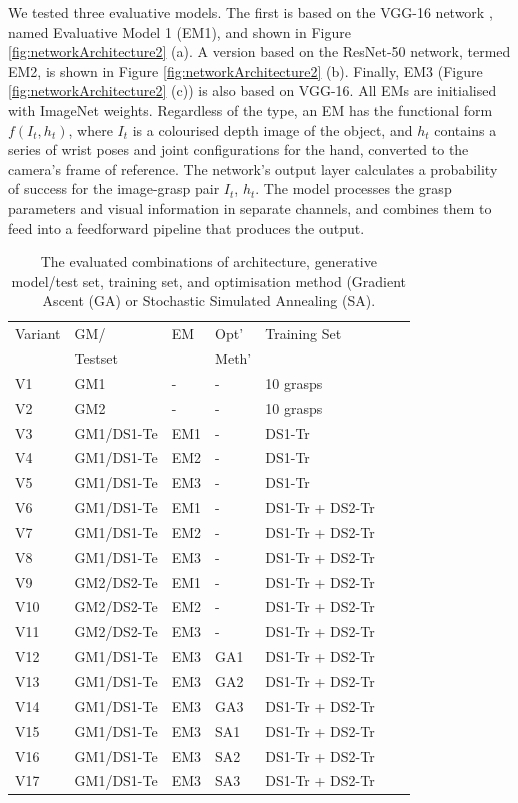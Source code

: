 We tested three evaluative models. The first is based on the VGG-16 network \cite{Simonyan14c}, named Evaluative Model 1 (EM1), and shown in Figure \ref{fig:networkArchitecture2} (a). A version based on the ResNet-50 network, termed EM2, is shown in Figure \ref{fig:networkArchitecture2} (b). Finally, EM3 (Figure \ref{fig:networkArchitecture2} (c)) is also based on VGG-16. All EMs are initialised with ImageNet weights. Regardless of the type, an EM has the functional form $f(I_t, h_t)$, where $I_t$ is a colourised depth image of the object, and $h_t$ contains a series of wrist poses and joint configurations for the hand, converted to the camera's frame of reference. The network's output layer calculates a probability of success for the image-grasp pair $I_t$, $h_t$. The model processes the grasp parameters and visual information in separate channels, and combines them to feed into a feedforward pipeline that produces the output.
\begin{table}[b]
\footnotesize
\centering
\begin{tabular}{|l|l|l|l|l|l|l|}
\hline
Variant & GM/  & EM & Opt'  & Training Set \\ 
 & Testset & & Meth' & \\ \hline
V1 & GM1    & - & - & 10 grasps  \\ \hline
V2 & GM2    & - & - & 10 grasps  \\ \hline
V3 & GM1/DS1-Te & EM1 & - & DS1-Tr \\ \hline
V4 & GM1/DS1-Te & EM2 & - & DS1-Tr \\ \hline
V5 & GM1/DS1-Te & EM3 & - & DS1-Tr  \\ \hline
V6 & GM1/DS1-Te & EM1 & - & DS1-Tr + DS2-Tr \\ \hline
V7 & GM1/DS1-Te & EM2 & - & DS1-Tr + DS2-Tr \\ \hline
V8 & GM1/DS1-Te & EM3 & - & DS1-Tr + DS2-Tr \\ \hline
V9 & GM2/DS2-Te & EM1 & - & DS1-Tr + DS2-Tr \\ \hline
V10 & GM2/DS2-Te & EM2 & - & DS1-Tr + DS2-Tr \\ \hline
V11 & GM2/DS2-Te & EM3 & - & DS1-Tr + DS2-Tr \\ \hline
V12 & GM1/DS1-Te & EM3 & GA1 & DS1-Tr + DS2-Tr \\ \hline
V13 & GM1/DS1-Te & EM3 & GA2 & DS1-Tr + DS2-Tr \\ \hline
V14 & GM1/DS1-Te & EM3 & GA3 & DS1-Tr + DS2-Tr \\ \hline
V15 & GM1/DS1-Te & EM3 & SA1 & DS1-Tr + DS2-Tr \\ \hline
V16 & GM1/DS1-Te & EM3 & SA2 & DS1-Tr + DS2-Tr \\ \hline
V17 & GM1/DS1-Te & EM3 & SA3 & DS1-Tr + DS2-Tr \\ \hline
\end{tabular}
\caption{The evaluated combinations of architecture, generative model/test set, training set, and optimisation method (Gradient Ascent (GA) or Stochastic Simulated Annealing (SA).}
\label{table:GEBreakdown}
\end{table}

